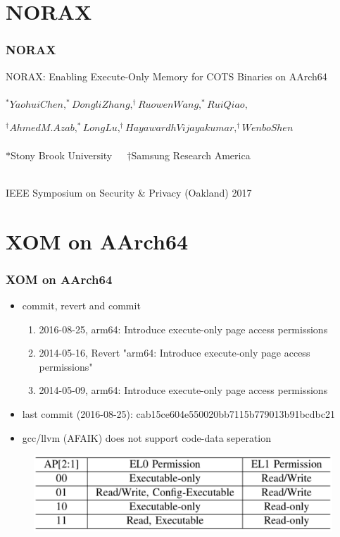 \documentclass[aspectratio=169]{beamer}
\begin{document}

\section{NORAX}
\begin{frame}
\frametitle{NORAX}
\begin{center}
{\huge{NORAX: Enabling Execute-Only Memory for COTS Binaries on AArch64}}
\\~\\

$^{\ast}Yaohui Chen, ^{\ast}Dongli Zhang, ^{\dagger}Ruowen Wang, ^{\ast}Rui Qiao,$
	
$^{\dagger}Ahmed M. Azab, ^{\ast}Long Lu, ^{\dagger}Hayawardh Vijayakumar, ^{\dagger}Wenbo Shen$
\\~\\

$\ast$Stony Brook University \,\,\,\,\, $\dagger$Samsung Research America
\\~\\
\vspace{10mm}

IEEE Symposium on Security \& Privacy (Oakland) 2017
\end{center}
\end{frame}


\section{XOM on AArch64}
\begin{frame}
\frametitle{XOM on AArch64}
\begin{itemize}
\item commit, revert and commit
	\begin{enumerate}
	\item 2016-08-25, arm64: Introduce execute-only page access permissions
	\item 2014-05-16, Revert "arm64: Introduce execute-only page access permissions"
	\item 2014-05-09, arm64: Introduce execute-only page access permissions
	\end{enumerate}
\item last commit (2016-08-25): cab15ce604e550020bb7115b779013b91bcdbc21
\item gcc/llvm (AFAIK) does not support code-data seperation
\end{itemize}
\begin{figure}
\includegraphics[width=1.0\linewidth]{figures/permission.pdf}
\end{figure}
\end{frame}
\end{document}
